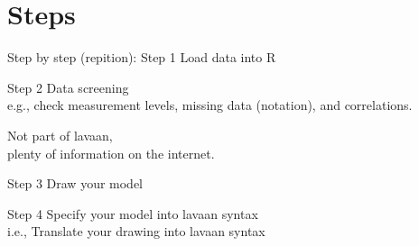 \documentclass[10pt]{beamer}\usepackage[]{graphicx}\usepackage[]{xcolor}
\begin{document}
\section{Steps}
%
\begin{frame}{Step by step (repition): Step 1}
\Large Load data into R 
\end{frame}
\begin{frame}{Step 2}
\Large Data screening\\
e.g., check measurement levels, missing data (notation),
and correlations.

\vspace{5mm}

Not part of lavaan,\\
plenty of information on the internet.
\end{frame}
\begin{frame}{Step 3}
\Large Draw your model
\end{frame}
\begin{frame}{Step 4}
\Large Specify your model into lavaan syntax\\
i.e., Translate your drawing into lavaan syntax
\end{frame}
\end{document}
